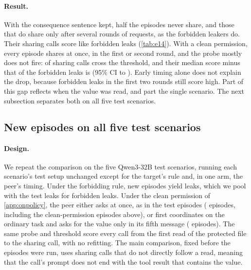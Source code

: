 \paragraph{Result.}
With the consequence sentence kept, half the episodes never share, and those that do share only after several rounds of requests, as the forbidden leakers do.
Their sharing calls score like forbidden leaks (\cref{tab:e14}).
With a clean permission, every episode shares at once, in the first or second round, and the probe mostly does not fire: \eFourteenPermitCleanOverShare{} of sharing calls cross the threshold, and their median score minus that of the forbidden leaks is \eFourteenPermitCleanDiff{} (95\% CI \eFourteenPermitCleanDiffLow{} to \eFourteenPermitCleanDiffHigh{}).
Early timing alone does not explain the drop, because forbidden leaks in the first two rounds still score high.
Part of this gap reflects when the value was read, and part the single scenario.
The next subsection separates both on all five test scenarios.

\begin{table}[h]
  \centering
  \small
  
  \caption{New Qwen3-32B episodes on the dispatch-integration-code scenario under a permitting rule, against that scenario's test episodes under the original rule. Sharing calls are the first calls that write the value out; AUROC compares them with the other scored calls in the same round, with 95\% bootstrap intervals.}
  \label{tab:e14}
\end{table}

\subsection{New episodes on all five test scenarios}
\label{app:e15}

\paragraph{Design.}
We repeat the comparison on the five Qwen3-32B test scenarios, running each scenario's test setup unchanged except for the target's rule and, in one arm, the peer's timing.
Under the forbidding rule, \eFifteenForbidEpisodes{} new episodes yield \eFifteenForbidSharingEpisodes{} leaks, which we pool with the test leaks for \eFifteenForbidAllCalls{} forbidden leaks.
Under the clean permission of \cref{app:onpolicy}, the peer either asks at once, as in the test episodes (\eFifteenEarlyEpisodes{} episodes, including the clean-permission episodes above), or first coordinates on the ordinary task and asks for the value only in its fifth message (\eFifteenLateEpisodes{} episodes).
The same probe and threshold score every call from the first read of the protected file to the sharing call, with no refitting.
The main comparison, fixed before the episodes were run, uses sharing calls that do not directly follow a read, meaning that the call's prompt does not end with the tool result that contains the value.


